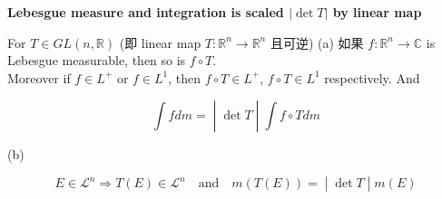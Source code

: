 \documentclass{qlnotes-export}
\begin{document}
\begin{theorem}{\protect{}\label{kn-lebesgue-measure-and-integration-is-scaled-det-t-by-linear-map}{\textbf{Lebesgue
measure and integration is scaled \(|\det T|\) by linear map}}}

For \(T \in GL(n,{\mathbb{R}})\) (即 linear map \(T:{\mathbb{R}}^{n}\rightarrow{\mathbb{R}}^{n}\) 且可逆) (a) 如果 \(f:{\mathbb{R}}^{n}\rightarrow{\mathbb{C}}\) is Lebesgue measurable, then so is \(f \circ T\).\\
Moreover if \(f \in L^{+}\) or \(f \in L^{1}\), then \(f \circ T \in L^{+}\), \(f \circ T \in L^{1}\) respectively. And

\[\left. \int f dm = \middle| \det T \middle| \int f \circ T dm \right.\]

(b)

\[\left. E \in \mathcal{L}^{n}\Longrightarrow T(E) \in \mathcal{L}^{n}\quad\text{and}\quad m(T(E)) = \middle| \det T \middle| m(E) \right.\]

\end{theorem}
\end{document}
